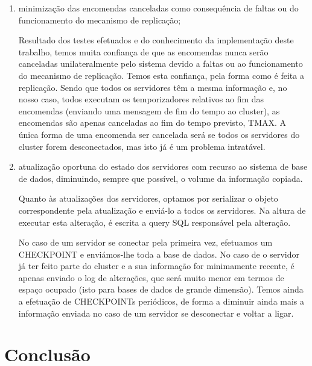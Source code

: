 \documentclass[a4paper]{report}
\begin{document}
{\begin{enumerate}
		\item minimização das encomendas canceladas como consequência de faltas ou do funcionamento do mecanismo de replicação;
		
		Resultado dos testes efetuados e do conhecimento da implementação deste trabalho, temos muita confiança de que as encomendas nunca serão canceladas unilateralmente pelo sistema devido a faltas ou ao funcionamento do mecanismo de replicação. Temos esta confiança, pela forma como é feita a replicação. Sendo que todos os servidores têm a mesma informação e, no nosso caso, todos executam os temporizadores relativos ao fim das encomendas (enviando uma mensagem de fim do tempo ao cluster), as encomendas são apenas canceladas ao fim do tempo previsto, TMAX. A única forma de uma encomenda ser cancelada será se todos os servidores do cluster forem desconectados, mas isto já é um problema intratável.
		
		\item atualização oportuna do estado dos servidores com recurso ao sistema de base de dados, diminuindo, sempre que possível, o volume da informação copiada.
		
		Quanto às atualizações dos servidores, optamos por serializar o objeto correspondente pela atualização e enviá-lo a todos os servidores. Na altura de executar esta alteração, é escrita a query SQL responsável pela alteração.
		
		No caso de um servidor se conectar pela primeira vez, efetuamos um CHECKPOINT e enviámos-lhe toda a base de dados. No caso de o servidor já ter feito parte do cluster e a sua informação for minimamente recente, é apenas enviado o log de alterações, que será muito menor em termos de espaço ocupado (isto para bases de dados de grande dimensão). Temos ainda a efetuação de CHECKPOINTs periódicos, de forma a diminuir ainda mais a informação enviada no caso de um servidor se desconectar e voltar a ligar.
		
	\end{enumerate}
}

\chapter{Conclusão} \label{ch:Conclusion}
\large{
	
}

\appendix
\end{document}

